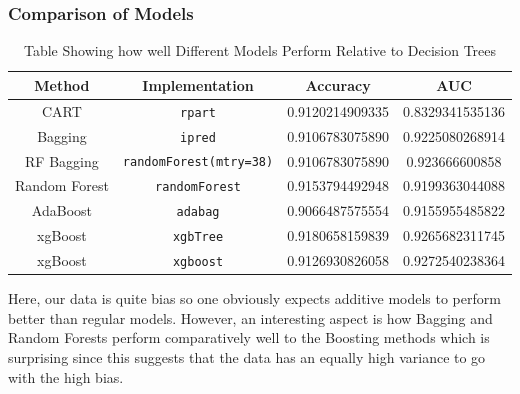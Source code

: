 \documentclass[11pt,a4paper]{report}
\begin{document}
\subsubsection{Comparison of Models}
\begin{table}
    \centering
    \begin{tabular}{|c|c|c|c|}
        \hline
        \textbf{Method} & \textbf{Implementation} & \textbf{Accuracy} & \textbf{AUC} \\
        \hline
        CART & {\color{blue} \texttt{rpart}} & 0.9120214909335 & 0.8329341535136 \\
        \hline
        Bagging & {\color{blue} \texttt{ipred}} & 0.9106783075890 & 0.9225080268914 \\
        \hline
        RF Bagging & {\color{blue} \texttt{randomForest(mtry=38)}} & 0.9106783075890 & 0.923666600858 \\
        \hline
        Random Forest & {\color{blue} \texttt{randomForest}} & 0.9153794492948 & 0.9199363044088 \\
        \hline
        AdaBoost & {\color{blue} \texttt{adabag}} & 0.9066487575554 & 0.9155955485822 \\
        \hline
        xgBoost & {\color{blue} \texttt{xgbTree}} & 0.9180658159839 & 0.9265682311745 \\
        \hline
        xgBoost & {\color{blue} \texttt{xgboost}} & 0.9126930826058 & 0.9272540238364 \\
        \hline
    \end{tabular}
    \caption{Table Showing how well Different Models Perform Relative to Decision Trees}
    \label{tab:allmodel}
\end{table}
Here, our data is quite bias so one obviously expects additive models to perform better than regular models. 
However, an interesting aspect is how Bagging and Random Forests perform comparatively well to the Boosting methods which is surprising since this suggests that the data has an equally high variance to go with the high bias.
\end{document}
